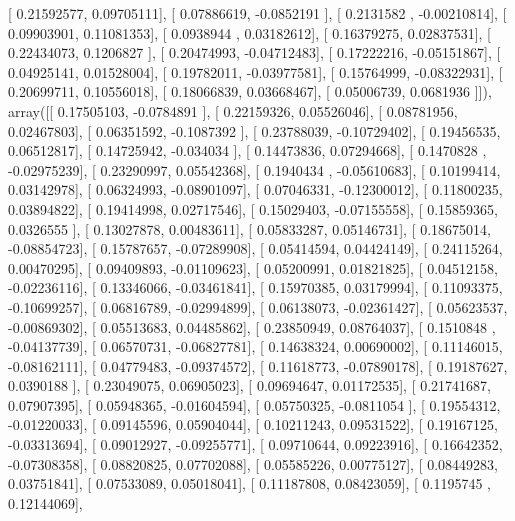 \documentclass{article}
\begin{document}
       [ 0.21592577,  0.09705111],
       [ 0.07886619, -0.0852191 ],
       [ 0.2131582 , -0.00210814],
       [ 0.09903901,  0.11081353],
       [ 0.0938944 ,  0.03182612],
       [ 0.16379275,  0.02837531],
       [ 0.22434073,  0.1206827 ],
       [ 0.20474993, -0.04712483],
       [ 0.17222216, -0.05151867],
       [ 0.04925141,  0.01528004],
       [ 0.19782011, -0.03977581],
       [ 0.15764999, -0.08322931],
       [ 0.20699711,  0.10556018],
       [ 0.18066839,  0.03668467],
       [ 0.05006739,  0.0681936 ]]), array([[ 0.17505103, -0.0784891 ],
       [ 0.22159326,  0.05526046],
       [ 0.08781956,  0.02467803],
       [ 0.06351592, -0.1087392 ],
       [ 0.23788039, -0.10729402],
       [ 0.19456535,  0.06512817],
       [ 0.14725942, -0.034034  ],
       [ 0.14473836,  0.07294668],
       [ 0.1470828 , -0.02975239],
       [ 0.23290997,  0.05542368],
       [ 0.1940434 , -0.05610683],
       [ 0.10199414,  0.03142978],
       [ 0.06324993, -0.08901097],
       [ 0.07046331, -0.12300012],
       [ 0.11800235,  0.03894822],
       [ 0.19414998,  0.02717546],
       [ 0.15029403, -0.07155558],
       [ 0.15859365,  0.0326555 ],
       [ 0.13027878,  0.00483611],
       [ 0.05833287,  0.05146731],
       [ 0.18675014, -0.08854723],
       [ 0.15787657, -0.07289908],
       [ 0.05414594,  0.04424149],
       [ 0.24115264,  0.00470295],
       [ 0.09409893, -0.01109623],
       [ 0.05200991,  0.01821825],
       [ 0.04512158, -0.02236116],
       [ 0.13346066, -0.03461841],
       [ 0.15970385,  0.03179994],
       [ 0.11093375, -0.10699257],
       [ 0.06816789, -0.02994899],
       [ 0.06138073, -0.02361427],
       [ 0.05623537, -0.00869302],
       [ 0.05513683,  0.04485862],
       [ 0.23850949,  0.08764037],
       [ 0.1510848 , -0.04137739],
       [ 0.06570731, -0.06827781],
       [ 0.14638324,  0.00690002],
       [ 0.11146015, -0.08162111],
       [ 0.04779483, -0.09374572],
       [ 0.11618773, -0.07890178],
       [ 0.19187627,  0.0390188 ],
       [ 0.23049075,  0.06905023],
       [ 0.09694647,  0.01172535],
       [ 0.21741687,  0.07907395],
       [ 0.05948365, -0.01604594],
       [ 0.05750325, -0.0811054 ],
       [ 0.19554312, -0.01220033],
       [ 0.09145596,  0.05904044],
       [ 0.10211243,  0.09531522],
       [ 0.19167125, -0.03313694],
       [ 0.09012927, -0.09255771],
       [ 0.09710644,  0.09223916],
       [ 0.16642352, -0.07308358],
       [ 0.08820825,  0.07702088],
       [ 0.05585226,  0.00775127],
       [ 0.08449283,  0.03751841],
       [ 0.07533089,  0.05018041],
       [ 0.11187808,  0.08423059],
       [ 0.1195745 ,  0.12144069],
\end{document}
